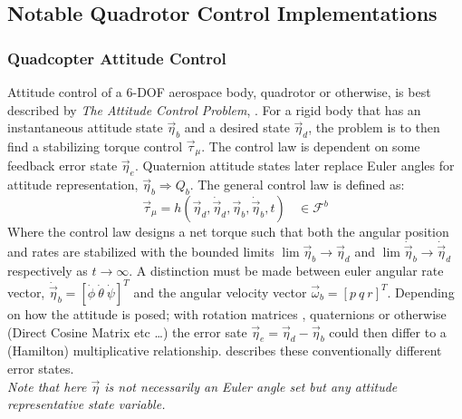 \subsection{Notable Quadrotor Control Implementations}
\label{subsec:intro.lit.control}
\subsubsection*{Quadcopter Attitude Control}
Attitude control of a 6-DOF aerospace body, quadrotor or otherwise, is best described by \emph{The Attitude Control Problem},  \cite{attitudecontrolproblem}. For a rigid body that has an instantaneous attitude state $\vec{\eta}_b$ and a desired state $\vec{\eta}_d$, the problem is to then find a stabilizing torque control $\vec{\tau}_\mu$. The control law is dependent on some feedback error state $\vec{\eta}_e$. Quaternion attitude states later replace Euler angles for attitude representation, $\vec{\eta}_b\Rightarrow Q_b$. The general control law is defined as:
\begin{equation} \label{eq:2}
\vec{\tau}_\mu = h(\vec{\eta}_d,\dot{\vec{\eta}}_d,\vec{\eta}_b,\dot{\vec{\eta}}_b,t)~~~~\in\mathcal{F}^b
\end{equation}
Where the control law designs a net torque such that both the angular position and rates are stabilized with the bounded limits $\lim\vec{\eta}_b \rightarrow \vec{\eta}_d$ and $\lim\dot{\vec{\eta}}_b \rightarrow \dot{\vec{\eta}}_d$ respectively as $t \rightarrow \infty$. A distinction must be made between euler angular rate vector, $\dot{\vec{\eta}}_b=[\dot{\phi}~\dot{\theta}~\dot{\psi}]^T$ and the angular velocity vector $\vec{\omega}_b=[p~q~r]^T$. Depending on how the attitude is posed; with rotation matrices \cite{rigidbodylecture,eulerrigidbody,rotationsequences}, quaternions \cite{quaterniondynamics, rotationsequences, spacecraftattitutdequaternions,fullquaternion} or otherwise (Direct Cosine Matrix etc \ldots) the error sate $\vec{\eta}_e= \vec{\eta}_d - \vec{\eta}_b$ could then differ to a (Hamilton) multiplicative relationship. \cite{attitudecontrolproblem} describes these conventionally different error states.
\\
\emph{\color{Gray}Note that here $\vec{\eta}$ is not necessarily an Euler angle set but any attitude representative state variable.}
\par

